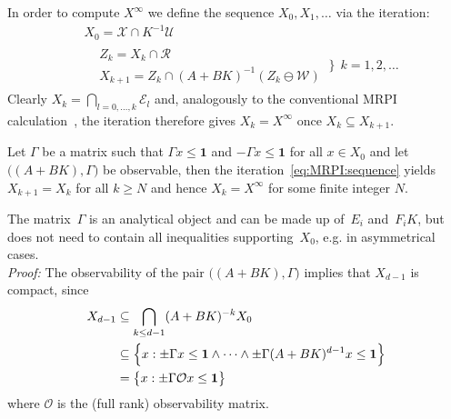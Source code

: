 \documentclass{ifacconf}
\def\bpf{\textnormal{\textit{Proof:}\hspace{1ex}}}
\newcommand{\Obs}{\mathcal{O}}
\providecommand{\E}{\mathcal E}
\providecommand{\W}{\mathcal W}
\providecommand{\X}{\mathcal X}
\providecommand{\R}{\mathcal R}
\providecommand{\bfa}[1]{\mathbf{#1}}
\begin{document}
%
In order to compute $X^\infty$ we define the sequence $X_0,X_1,\ldots$ via the iteration:
%
\begin{equation}\label{eq:MRPI:sequence}
\begin{aligned}
  & X_0 = \X\cap K^{-1}\mathcal U \\
  & \begin{aligned}
      & Z_k = X_k\cap\R\\
      & X_{k+1} = Z_k\cap(A+BK)^{-1}(Z_k\ominus\W)
    \end{aligned} 
  \ \Biggr\} \ \ k = 1,2,\ldots
\end{aligned}
\end{equation}
%
Clearly $X_k = \bigcap_{l=0,\ldots,k}\E_l$ and, analogously to the conventional MRPI calculation~\citep{Kolmanovsky:1998}, the iteration therefore gives $X_k = X^\infty$ once $X_k\subseteq X_{k+1}$.

\vspace{0.5\baselineskip}
\begin{thm}\label{thm2}
Let $\Gamma$ be a matrix such that $\Gamma x\leq\bfa{1}$ and $-\Gamma x\leq\bfa{1}$ for all $x\in X_0$ and let $\bigl((A+BK),\Gamma\bigr)$ be observable, then the iteration~\eqref{eq:MRPI:sequence} %
yields $X_{k+1}=X_k$ for all $k\geq N$ and hence $X_k=X^\infty$ for some finite integer $N$.
\end{thm}
%
The matrix~$\Gamma$ is an analytical object and can be made up of~$E_i$ and~$F_iK$, but does not need to contain all inequalities supporting~$X_0$, e.g. in asymmetrical cases.
%
\\[1em]
%
\bpf
%
The observability of the pair $\bigl((A+BK),\Gamma\bigr)$ implies that $X_{d-1}$ is compact, since 
\begin{align*}
X_{d-1} 
&\subseteq\bigcap_{k\leq d-1}(A+BK)^{-k} X_0\\
&\subseteq \Bigl\{x:\pm\Gamma x\leq\bfa{1}\wedge\dots\wedge\pm\Gamma(A+BK)^{d-1} x\leq\bfa{1} \Bigr\}\\
& = \bigl\{x:\pm\Gamma \Obs x\leq \bfa{1}\bigr\}
\end{align*}
where $\Obs$ is the (full rank) observability matrix.
\end{document}
